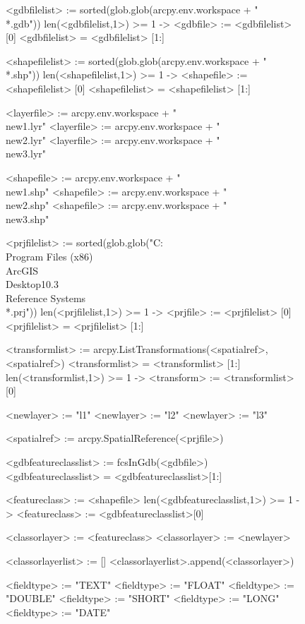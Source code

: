 \begin{figure}
{\scriptsize
\begin{code}
<gdbfilelist> := sorted(glob.glob(arcpy.env.workspace + "\\*.gdb"))
len(<gdbfilelist,1>) >= 1 -> <gdbfile> := <gdbfilelist> [0]
<gdbfilelist> = <gdbfilelist> [1:]

<shapefilelist> := sorted(glob.glob(arcpy.env.workspace + "\\*.shp"))
len(<shapefilelist,1>) >= 1 -> <shapefile> := <shapefilelist> [0]
<shapefilelist> = <shapefilelist> [1:]

<layerfile> := arcpy.env.workspace + "\\new1.lyr"
<layerfile> := arcpy.env.workspace + "\\new2.lyr"
<layerfile> := arcpy.env.workspace + "\\new3.lyr"

<shapefile> := arcpy.env.workspace + "\\new1.shp"
<shapefile> := arcpy.env.workspace + "\\new2.shp"
<shapefile> := arcpy.env.workspace + "\\new3.shp"

<prjfilelist> := sorted(glob.glob("C:\\Program Files (x86)\\ArcGIS\\Desktop10.3\\Reference Systems\\*.prj"))
len(<prjfilelist,1>) >= 1 -> <prjfile> := <prjfilelist> [0]
<prjfilelist> = <prjfilelist> [1:]

<transformlist> := arcpy.ListTransformations(<spatialref>,<spatialref>)
<transformlist> = <transformlist> [1:]
len(<transformlist,1>) >= 1 -> <transform> := <transformlist> [0]

<newlayer> := "l1"
<newlayer> := "l2"
<newlayer> := "l3"

<spatialref> := arcpy.SpatialReference(<prjfile>)

<gdbfeatureclasslist> := fcsInGdb(<gdbfile>)
<gdbfeatureclasslist> = <gdbfeatureclasslist>[1:]

<featureclass> := <shapefile>
len(<gdbfeatureclasslist,1>) >= 1 -> <featureclass> := <gdbfeatureclasslist>[0]

<classorlayer> := <featureclass>
<classorlayer> := <newlayer>

<classorlayerlist> := []
<classorlayerlist>.append(<classorlayer>)

<fieldtype> := "TEXT"
<fieldtype> := "FLOAT"
<fieldtype> := "DOUBLE"
<fieldtype> := "SHORT"
<fieldtype> := "LONG"
<fieldtype> := "DATE"


\end{code}}
\end{figure}
